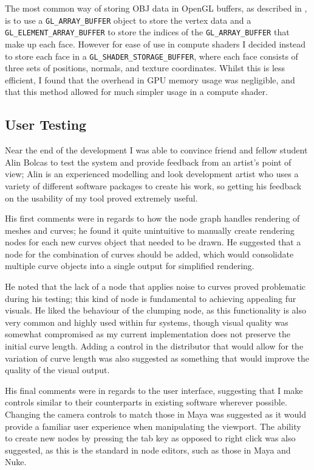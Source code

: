 \documentclass[]{acmsiggraph}
\begin{document}
The most common way of storing OBJ data in OpenGL buffers, as described in \cite{objLoading}, is to use a \verb|GL_ARRAY_BUFFER| object to store the vertex data and a \verb|GL_ELEMENT_ARRAY_BUFFER| to store the indices of the \verb|GL_ARRAY_BUFFER| that make up each face. However for ease of use in compute shaders I decided instead to store each face in a \verb|GL_SHADER_STORAGE_BUFFER|, where each face consists of three sets of positions, normals, and texture coordinates. Whilst this is less efficient, I found that the overhead in GPU memory usage was negligible, and that this method allowed for much simpler usage in a compute shader.

\subsection{User Testing} \label{sec:usertesting}
Near the end of the development I was able to convince friend and fellow student Alin Bolcas to test the system and provide feedback from an artist's point of view; Alin is an experienced modelling and look development artist who uses a variety of different software packages to create his work, so getting his feedback on the usability of my tool proved extremely useful.

His first comments were in regards to how the node graph handles rendering of meshes and curves; he found it quite unintuitive to manually create rendering nodes for each new curves object that needed to be drawn. He suggested that a node for the combination of curves should be added, which would consolidate multiple curve objects into a single output for simplified rendering.

He noted that the lack of a node that applies noise to curves proved problematic during his testing; this kind of node is fundamental to achieving appealing fur visuals. He liked the behaviour of the clumping node, as this functionality is also very common and highly used within fur systems, though visual quality was somewhat compromised as my current implementation does not preserve the initial curve length. Adding a control in the distributor that would allow for the variation of curve length was also suggested as something that would improve the quality of the visual output.

His final comments were in regards to the user interface, suggesting that I make controls similar to their counterparts in existing software wherever possible. Changing the camera controls to match those in Maya was suggested as it would provide a familiar user experience when manipulating the viewport. The ability to create new nodes by pressing the tab key as opposed to right click was also suggested, as this is the standard in node editors, such as those in Maya and Nuke.
\end{document}
